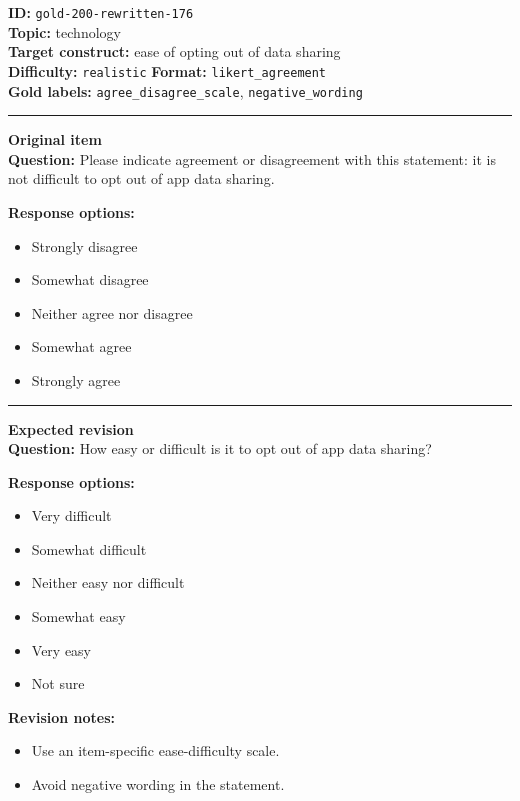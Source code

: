 \documentclass[10pt,a4paper]{article}
\newcommand{\sectionline}{\vspace{0.15em}\hrule\vspace{0.35em}}
\begin{document}
\begin{tcolorbox}[colframe=FlawRed,colback=white,colbacktitle=FlawRed!9,coltitle=black,title={Item 176\hfill Flawed item}]
\textbf{ID:} \texttt{gold-200-rewritten-176}\\
\textbf{Topic:} technology\\
\textbf{Target construct:} ease of opting out of data sharing\\
\textbf{Difficulty:} \texttt{realistic} \quad \textbf{Format:} \texttt{likert\_agreement}\\
\textbf{Gold labels:} \texttt{agree\_disagree\_scale}, \texttt{negative\_wording}\\
\sectionline
\textbf{Original item}\\
\textbf{Question:} Please indicate agreement or disagreement with this statement: it is not difficult to opt out of app data sharing.
\par\textbf{Response options:}
\begin{itemize}
\item Strongly disagree
\item Somewhat disagree
\item Neither agree nor disagree
\item Somewhat agree
\item Strongly agree
\end{itemize}
\sectionline
\textbf{Expected revision}\\
\textbf{Question:} How easy or difficult is it to opt out of app data sharing?
\par\textbf{Response options:}
\begin{itemize}
\item Very difficult
\item Somewhat difficult
\item Neither easy nor difficult
\item Somewhat easy
\item Very easy
\item Not sure
\end{itemize}
\par\textbf{Revision notes:}
\begin{itemize}
\item Use an item-specific ease-difficulty scale.
\item Avoid negative wording in the statement.
\end{itemize}
\end{tcolorbox}
\end{document}
